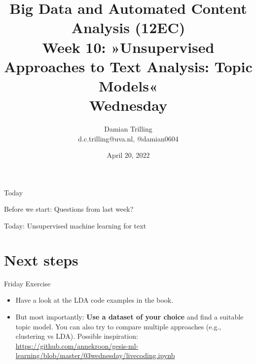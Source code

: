 

\graphicspath{{../../resources/img/}}




\title[Big Data and Automated Content Analysis]{\textbf{Big Data and Automated Content Analysis (12EC)} 
\\Week 10: »Unsupervised Approaches to Text Analysis: Topic Models«
\\Wednesday}
\author[Damian Trilling]{Damian Trilling\\ \footnotesize{d.c.trilling@uva.nl, @damian0604 \\}}
\date{April 20, 2022}


\begin{frame}{}
	\titlepage
\end{frame}

\begin{frame}{Today}
	\tableofcontents
\end{frame}
\begin{frame}[standout]
Before we start: Questions from last week?
\end{frame}


\begin{frame}[standout]
Today: Unsupervised machine learning for text
\end{frame}









\section{Next steps}

\begin{frame}[plain]

  \begin{block}{Friday Exercise}
    \footnotesize
  \begin{itemize}
  \item Have a look at the LDA code examples in the book.
  \item But most importantly: \textbf{Use a dataset of your choice} and find a suitable topic model. You can also try to compare multiple approaches (e.g., clustering vs LDA). Possible inspiration: \url{https://github.com/annekroon/gesis-ml-learning/blob/master/03wednesday/livecoding.ipynb}
    \end{itemize}
\end{block}

\end{frame}


\begin{frame}
	\printbibliography
\end{frame}




